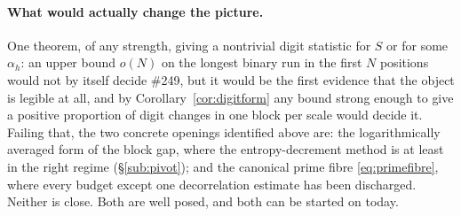 \paragraph{What would actually change the picture.}
One theorem, of any strength, giving a nontrivial digit statistic for $S$ or
for some $\alpha_h$: an upper bound $o(N)$ on the longest binary run in the
first $N$ positions would not by itself decide \#249, but it would be the
first evidence that the object is legible at all, and by
Corollary~\ref{cor:digitform} any bound strong enough to give a positive
proportion of digit changes in one block per scale would decide it. Failing
that, the two concrete openings identified above are: the logarithmically
averaged form of the block gap, where the entropy-decrement method is at
least in the right regime (\S\ref{sub:pivot}); and the canonical prime fibre
\eqref{eq:primefibre}, where every budget except one decorrelation estimate
has been discharged. Neither is close. Both are well posed, and both can be
started on today.
